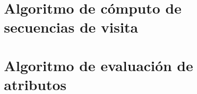 \section{Algoritmo de cómputo de secuencias de visita}

\section{Algoritmo de evaluación de atributos}




